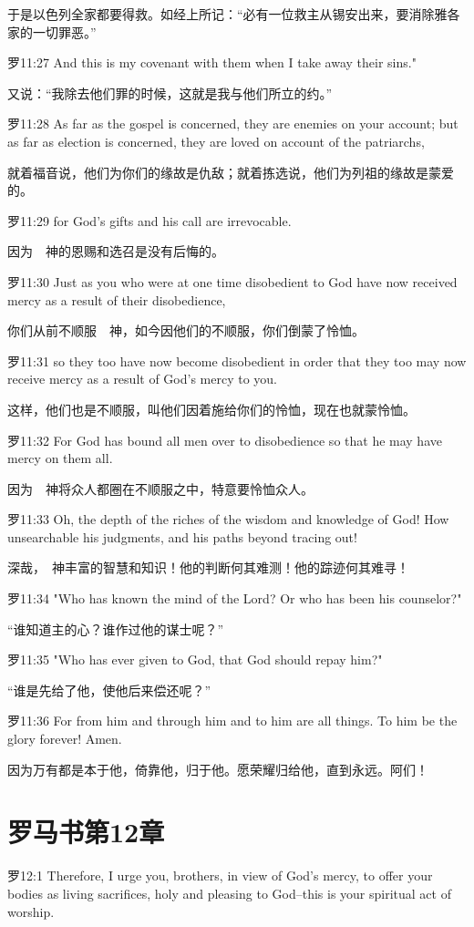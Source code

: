 \documentclass[a4paper,11pt,onecolumn,twoside]{ctexart}
\begin{document}
\begin{multicols}{2}
 于是以色列全家都要得救。如经上所记：“必有一位救主从锡安出来，要消除雅各家的一切罪恶。”


 罗11:27
 And this is my covenant with them when I take away their sins."

 又说：“我除去他们罪的时候，这就是我与他们所立的约。”


 罗11:28
 As far as the gospel is concerned, they are enemies on your account; but as far as election is concerned, they are loved on account of the patriarchs,

 就着福音说，他们为你们的缘故是仇敌；就着拣选说，他们为列祖的缘故是蒙爱的。


 罗11:29
 for God's gifts and his call are irrevocable.

 因为　神的恩赐和选召是没有后悔的。


 罗11:30
 Just as you who were at one time disobedient to God have now received mercy as a result of their disobedience,

 你们从前不顺服　神，如今因他们的不顺服，你们倒蒙了怜恤。


 罗11:31
 so they too have now become disobedient in order that they too may now receive mercy as a result of God's mercy to you.

 这样，他们也是不顺服，叫他们因着施给你们的怜恤，现在也就蒙怜恤。


 罗11:32
 For God has bound all men over to disobedience so that he may have mercy on them all.

 因为　神将众人都圈在不顺服之中，特意要怜恤众人。


 罗11:33
 Oh, the depth of the riches of the wisdom and knowledge of God! How unsearchable his judgments, and his paths beyond tracing out!

 深哉，　神丰富的智慧和知识！他的判断何其难测！他的踪迹何其难寻！


 罗11:34
 "Who has known the mind of the Lord? Or who has been his counselor?"

 “谁知道主的心？谁作过他的谋士呢？”


 罗11:35
 "Who has ever given to God, that God should repay him?"

 “谁是先给了他，使他后来偿还呢？”


 罗11:36
 For from him and through him and to him are all things. To him be the glory forever! Amen.

 因为万有都是本于他，倚靠他，归于他。愿荣耀归给他，直到永远。阿们！


 \section{罗马书第12章}
 罗12:1
 Therefore, I urge you, brothers, in view of God's mercy, to offer your bodies as living sacrifices, holy and pleasing to God--this is your spiritual act of worship.


\end{multicols}
\end{document}
